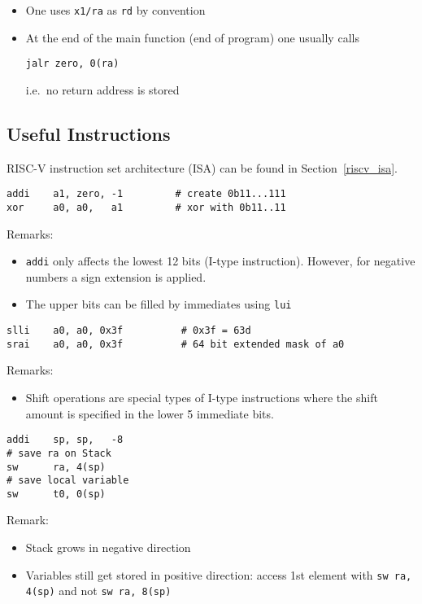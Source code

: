 \begin{itemize}
    \item One uses \texttt{x1/ra} as \texttt{rd} by convention
    \item At the end of the main function (end of program) one usually calls
          \begin{lstlisting}[language={[RISC-V]Assembler}]
jalr zero, 0(ra)
    \end{lstlisting}
          i.e.\ no return address is stored
\end{itemize}

\subsection{Useful Instructions}
RISC-V instruction set architecture (ISA)  can be found in Section\ \ref{riscv_isa}.

\newpar{}

\begin{lstlisting}[language={[RISC-V]Assembler}]
addi    a1, zero, -1         # create 0b11...111
xor     a0, a0,   a1         # xor with 0b11..11
\end{lstlisting}
Remarks:
\begin{itemize}
    \item \texttt{addi} only affects the lowest 12 bits (I-type instruction). However, for negative numbers a sign extension is applied.
    \item The upper bits can be filled by immediates using \texttt{lui}
\end{itemize}

\newpar{}

\begin{lstlisting}[language={[RISC-V]Assembler}]
slli    a0, a0, 0x3f          # 0x3f = 63d
srai    a0, a0, 0x3f          # 64 bit extended mask of a0
\end{lstlisting}

Remarks:
\begin{itemize}
    \item Shift operations are special types of I-type instructions where the shift amount is specified in the lower 5 immediate bits.
\end{itemize}

\newpar{}

\begin{lstlisting}[language={[RISC-V]Assembler}]
addi    sp, sp,   -8
# save ra on Stack
sw      ra, 4(sp)
# save local variable
sw      t0, 0(sp)
\end{lstlisting}
Remark:
\begin{itemize}
    \item Stack grows in negative direction
    \item Variables still get stored in positive direction: access 1st element with \texttt{sw ra, 4(sp)} and not \texttt{sw ra, 8(sp)}
\end{itemize}

